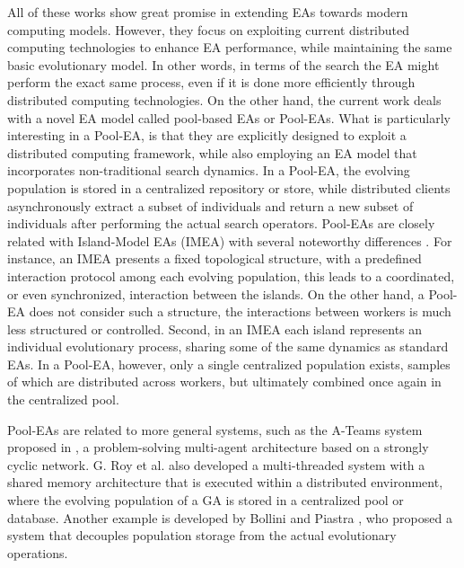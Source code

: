 All of these works show great promise in extending EAs towards modern computing models.
However, they focus on exploiting current distributed computing technologies to enhance EA performance, while maintaining the same basic evolutionary model.
In other words, in terms of the search the EA might perform the exact same process, even if it is done more efficiently through distributed computing technologies.
On the other hand, the current work deals with a novel EA model called pool-based EAs or Pool-EAs.
What is particularly interesting in a Pool-EA, is that they are explicitly designed to exploit a distributed computing framework, while also employing
an EA model that incorporates non-traditional search dynamics.
In a Pool-EA, the evolving population is stored in a centralized repository or store, while distributed clients asynchronously extract a subset
of individuals and return a new subset of individuals after performing the actual search operators.
Pool-EAs are closely related with Island-Model EAs (IMEA) \cite{cantu} with several noteworthy differences \cite{PoolvsIsland}.
For instance, an IMEA presents a fixed topological structure, with a predefined interaction protocol among each evolving population,
this leads to a coordinated, or even synchronized, interaction between the islands.
On the other hand, a Pool-EA does not consider such a structure, the interactions between workers is much less structured or controlled.
Second, in an IMEA each island represents an individual evolutionary process, sharing some of the same dynamics as standard EAs.
In a Pool-EA, however, only a single centralized population exists, samples of which are distributed across workers, but ultimately combined once again
in the centralized pool.

Pool-EAs are related to more general systems, such as the A-Teams system proposed in \cite{ateam}, a problem-solving multi-agent architecture based on a strongly cyclic network.
G. Roy et al. \cite{roy:2009} also developed a multi-threaded system with a shared memory architecture that is executed within a distributed environment,
where the evolving population of a GA is stored in a centralized pool or database.
Another example is developed by Bollini and Piastra \cite{bollini:1999}, who proposed a system that decouples population storage from the actual evolutionary operations.

